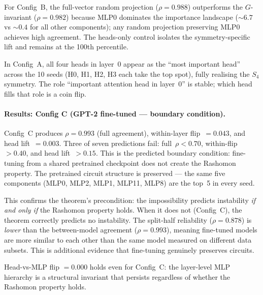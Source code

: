 \documentclass[11pt,a4paper]{article}
\begin{document}
For Config~B, the full-vector random projection ($\rho = 0.988$) outperforms the $G$-invariant ($\rho = 0.982$) because MLP0 dominates the importance landscape ($\sim 6.7$ vs $\sim 0.4$ for all other components); any random projection preserving MLP0 achieves high agreement.  The heads-only control isolates the symmetry-specific lift and remains at the 100th percentile.

In Config~A, all four heads in layer~0 appear as the ``most important head'' across the 10 seeds (H0, H1, H2, H3 each take the top spot), fully realising the $S_4$ symmetry.  The role ``important attention head in layer~0'' is stable; which head fills that role is a coin flip.

\paragraph{Results: Config C (GPT-2 fine-tuned --- boundary condition).}
Config~C produces $\rho = 0.993$ (full agreement), within-layer flip~$= 0.043$, and head lift~$= 0.003$.  Three of seven predictions fail: full~$\rho < 0.70$, within-flip~$> 0.40$, and head lift~$> 0.15$.  This is the predicted boundary condition: fine-tuning from a shared pretrained checkpoint does not create the Rashomon property.  The pretrained circuit structure is preserved --- the same five components (MLP0, MLP2, MLP1, MLP11, MLP8) are the top~5 in every seed.

This confirms the theorem's precondition: the impossibility predicts instability \emph{if and only if} the Rashomon property holds.  When it does not (Config~C), the theorem correctly predicts no instability.  The split-half reliability ($\rho = 0.878$) is \emph{lower} than the between-model agreement ($\rho = 0.993$), meaning fine-tuned models are more similar to each other than the same model measured on different data subsets.  This is additional evidence that fine-tuning genuinely preserves circuits.

Head-vs-MLP flip $= 0.000$ holds even for Config~C: the layer-level MLP hierarchy is a structural invariant that persists regardless of whether the Rashomon property holds.
\end{document}
